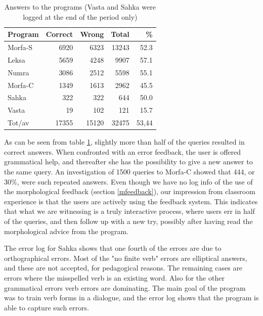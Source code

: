 \documentclass[11pt]{article}
\begin{document}
\begin{table}[htdp]
\caption{Answers to the programs (Vasta and Sahka were logged at the end of the period only)}
\begin{center}
\begin{tabular}{|l|r|r|r|r|}
\hline
Program     & Correct &   Wrong &    Total &  \% \\
\hline									 
Morfa-S  &  6920   & 6323    & 13243    & 52.3 \\
Leksa    &  5659   & 4248    & 9907	    & 57.1  \\
Numra    &  3086   & 2512    & 5598	    & 55.1  \\
Morfa-C  &  1349   & 1613    & 2962	    & 45.5  \\
Sahka    &   322   &   322   &  644	    & 50.0  \\
Vasta    &   19    &   102   &  121	    & 15.7 \\
\hline
Tot/av   & 17355  &  15120  &  32475  &  53,44\\
\hline
\end{tabular}
\end{center}
\label{log1}
\end{table}


As can be seen from table \ref{log1}, slightly more than half of the queries resulted in correct answers. When confronted with an error feedback, the user is offered grammatical help, and thereafter she has the possibility to give a new answer to the same query. An investigation of 1500 queries to Morfa-C showed that 444, or 30\%, were such repeated answers. Even though we have no log info of the use of the morphological feedback (section \ref{mfeedback}), our impression from classroom experience is that the users are actively using the feedback system. This indicates that what we are witnessing is a truly interactive process, where users err in half of the queries, and then follow up with a new try, possibly after having read the morphological advice from the program.

The error log for Sahka shows that one fourth of the errors are due to orthographical errors. Most of the "no finite verb" errors are elliptical answers, and these are not accepted, for pedagogical reasons. The remaining cases are errors where the misspelled verb is an existing word. Also for the other grammatical errors verb errors are dominating. The main goal of the program was to train verb forms in a dialogue, and the error log shows that the program is able to capture such errors.
\end{document}
